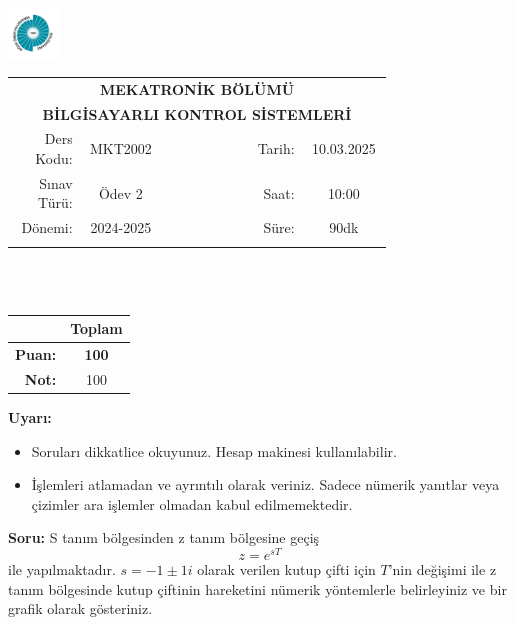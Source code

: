 \newcommand\UniversiteAdi{Niğde Ömer Halisdemir Üniversitesi}
\newcommand\BolumAdi{MEKATRONİK BÖLÜMÜ}
\newcommand\DersKodu{MKT2002}
\newcommand\DersAdi{BİLGİSAYARLI KONTROL SİSTEMLERİ}
\newcommand\SinavAdi{Ödev 2}
\newcommand\SinavTarihi{10.03.2025}
\newcommand\SinavSaati{10:00}
\newcommand\SinavSuresi{90dk}

\pagestyle{fancy}
\fancyhf{} %
\noindent \includegraphics[width=0.1\textwidth]{logo}
\begin{tabular}{
    p{0.15\linewidth}
    p{0.15\linewidth}
    p{0.2\linewidth}
    p{0.1\linewidth}
    p{0.15\linewidth}}
    \multicolumn{5}{c}{\textbf{\BolumAdi}}\\
    \multicolumn{5}{c}{\textbf{\DersAdi}}\\\hline
    \multicolumn{1}{|r|}{Ders Kodu:}&
    \multicolumn{1}{|c|}{\DersKodu}&
    \multicolumn{1}{|c|}{}& 
    \multicolumn{1}{|r|}{Tarih:}&
    \multicolumn{1}{|c|}{\SinavTarihi} \\\hline
    \multicolumn{1}{|r|}{Sınav Türü:}&
    \multicolumn{1}{|c|}{\SinavAdi}&  
    \multicolumn{1}{|c|}{}&
    \multicolumn{1}{|r|}{Saat:}&
    \multicolumn{1}{|c|}{\SinavSaati}\\\hline
    \multicolumn{1}{|r|}{Dönemi:}&
    \multicolumn{1}{|c|}{2024-2025}&
    \multicolumn{1}{|c|}{}&
    \multicolumn{1}{|r|}{Süre:}&
    \multicolumn{1}{|c|}{\SinavSuresi} \\\hline
    &&&&\\
\end{tabular}\\\\
\noindent\begin{center}
\begin{tabular}{|r|c|}\hline
    &\textbf{Toplam}\\\hline
    \textbf{Puan:} &\textbf{100}\\\hline
    \textbf{Not:}  &100\\\hline
\end{tabular}\end{center}
\noindent\textbf{Uyarı:}
\begin{itemize}\bfseries
    \item Soruları dikkatlice okuyunuz. Hesap makinesi kullanılabilir.
    \item İşlemleri atlamadan ve ayrıntılı olarak veriniz. Sadece nümerik yanıtlar veya çizimler ara işlemler olmadan kabul edilmemektedir.
\end{itemize}
\noindent\textbf{Soru:}  S tanım bölgesinden z tanım bölgesine geçiş 
\begin{equation}
    z=e^{sT}
\end{equation}
ile yapılmaktadır. $s=-1\pm 1i$ olarak verilen kutup çifti için $T$'nin değişimi ile z tanım bölgesinde kutup çiftinin hareketini nümerik yöntemlerle belirleyiniz ve bir grafik olarak gösteriniz. 


